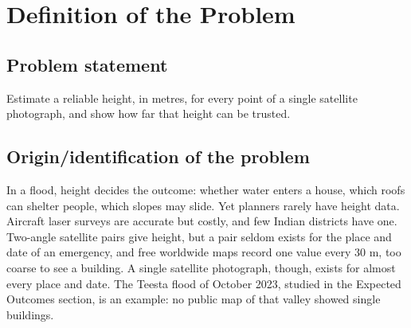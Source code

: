 \documentclass[11pt,a4paper]{article}
\newcommand{\psection}[2]{\section{#1}}
\newcommand{\m}{\ifmmode\,\mathrm{m}\else\,m\fi}
\begin{document}
\begin{abstract}
\noindent When a flood or landslide strikes, rescue teams need to know how tall buildings are, how high the ground lies and where water will reach. Most of India has no recent 3D map that can answer this. DepthWizard estimates the height of every building, tree and patch of ground from one ordinary satellite photograph, ties those heights to sea level, and says how accurate they are. Our main new idea is a height model built on Mamba, a recent kind of neural network that reads an image in one sweep. It is nine times smaller and 5.2 times faster than the published model it learns from, although its first version is less accurate. Around the model we add a ground-level correction that uses NASA's satellite lasers, an error range for every building, and eighteen tools for disaster teams. With the published model, the average height error is 3.90\m{} on 150 aerial test tiles, where a flat-ground guess is off by 5.65\m, and 4.85\m{} at eight Indian sites. On the 2023 Teesta flood in Sikkim, free satellite images map 1.28\,km$^2$ of damaged valley floor.

\medskip
\noindent\textbf{Keywords:} height from a single image; Mamba; satellite lasers; flood mapping; disaster management; India.
\end{abstract}

\setcounter{section}{2}
\psection{Definition of the Problem}{}
\label{sec:problem}

\subsection{Problem statement}
Estimate a reliable height, in metres, for every point of a single satellite photograph, and show how far that height can be trusted.

\subsection{Origin/identification of the problem}
In a flood, height decides the outcome: whether water enters a house, which roofs can shelter people, which slopes may slide. Yet planners rarely have height data. Aircraft laser surveys are accurate but costly, and few Indian districts have one. Two-angle satellite pairs give height, but a pair seldom exists for the place and date of an emergency, and free worldwide maps record one value every 30\m, too coarse to see a building. A single satellite photograph, though, exists for almost every place and date. The Teesta flood of October 2023, studied in the Expected Outcomes section, is an example: no public map of that valley showed single buildings.
\end{document}
